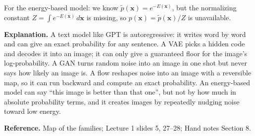 \documentclass[11pt]{article}
\begin{document}
For the energy-based model: we know $\tilde p(\mathbf{x}) = e^{-E(\mathbf{x})}$, but the normalizing constant $Z=\int e^{-E(\mathbf{x})}\,d\mathbf{x}$ is missing, so $p(\mathbf{x}) = \tilde p(\mathbf{x})/Z$ is unavailable.

\textbf{Explanation.} A text model like GPT is autoregressive: it writes word by word and can give an exact probability for any sentence. A VAE picks a hidden code and decodes it into an image; it can only give a guaranteed floor for the image's log-probability. A GAN turns random noise into an image in one shot but never says how likely an image is. A flow reshapes noise into an image with a reversible map, so it can run backward and compute an exact probability. An energy-based model can say ``this image is better than that one'', but not by how much in absolute probability terms, and it creates images by repeatedly nudging noise toward low energy.

\textbf{Reference.} Map of the families; Lecture 1 slides 5, 27--28; Hand notes Section 8.
\end{document}
